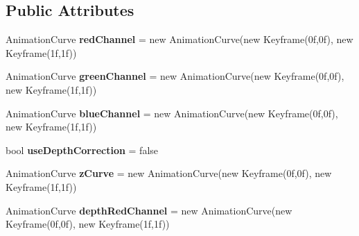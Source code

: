 \subsection*{Public Attributes}
\begin{DoxyCompactItemize}
\item 
Animation\+Curve {\bfseries red\+Channel} = new Animation\+Curve(new Keyframe(0f,0f), new Keyframe(1f,1f))\hypertarget{class_unity_standard_assets_1_1_image_effects_1_1_color_correction_curves_a7903ae8291d5e32137882f9f5498ed56}{}\label{class_unity_standard_assets_1_1_image_effects_1_1_color_correction_curves_a7903ae8291d5e32137882f9f5498ed56}

\item 
Animation\+Curve {\bfseries green\+Channel} = new Animation\+Curve(new Keyframe(0f,0f), new Keyframe(1f,1f))\hypertarget{class_unity_standard_assets_1_1_image_effects_1_1_color_correction_curves_a75b334e1edb4970b58bf00c0434553df}{}\label{class_unity_standard_assets_1_1_image_effects_1_1_color_correction_curves_a75b334e1edb4970b58bf00c0434553df}

\item 
Animation\+Curve {\bfseries blue\+Channel} = new Animation\+Curve(new Keyframe(0f,0f), new Keyframe(1f,1f))\hypertarget{class_unity_standard_assets_1_1_image_effects_1_1_color_correction_curves_a56123d1dfdb362c4eda3db142db0e861}{}\label{class_unity_standard_assets_1_1_image_effects_1_1_color_correction_curves_a56123d1dfdb362c4eda3db142db0e861}

\item 
bool {\bfseries use\+Depth\+Correction} = false\hypertarget{class_unity_standard_assets_1_1_image_effects_1_1_color_correction_curves_a9812451a2fd64a107315b47b11949065}{}\label{class_unity_standard_assets_1_1_image_effects_1_1_color_correction_curves_a9812451a2fd64a107315b47b11949065}

\item 
Animation\+Curve {\bfseries z\+Curve} = new Animation\+Curve(new Keyframe(0f,0f), new Keyframe(1f,1f))\hypertarget{class_unity_standard_assets_1_1_image_effects_1_1_color_correction_curves_a6b9f921e5ae7d1dc4fd4c243d35d3cba}{}\label{class_unity_standard_assets_1_1_image_effects_1_1_color_correction_curves_a6b9f921e5ae7d1dc4fd4c243d35d3cba}

\item 
Animation\+Curve {\bfseries depth\+Red\+Channel} = new Animation\+Curve(new Keyframe(0f,0f), new Keyframe(1f,1f))\hypertarget{class_unity_standard_assets_1_1_image_effects_1_1_color_correction_curves_a0651979e3b694bfe3f4a1d4f4ff1aa42}{}\label{class_unity_standard_assets_1_1_image_effects_1_1_color_correction_curves_a0651979e3b694bfe3f4a1d4f4ff1aa42}


\end{DoxyCompactItemize}
